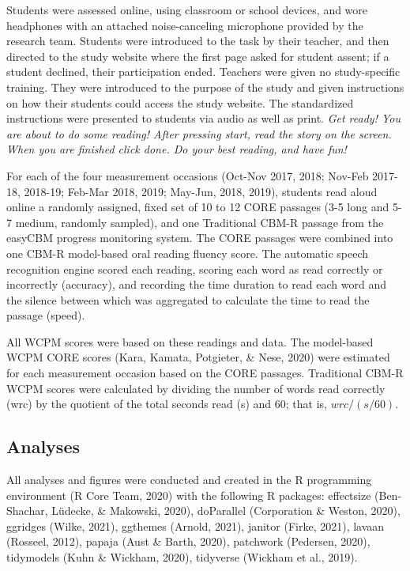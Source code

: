 \documentclass[
  english,
  man, fleqn, noextraspace]{apa6}
\begin{document}
Students were assessed online, using classroom or school devices, and wore headphones with an attached noise-canceling microphone provided by the research team. Students were introduced to the task by their teacher, and then directed to the study website where the first page asked for student assent; if a student declined, their participation ended. Teachers were given no study-specific training. They were introduced to the purpose of the study and given instructions on how their students could access the study website. The standardized instructions were presented to students via audio as well as print. \emph{Get ready! You are about to do some reading! After pressing start, read the story on the screen. When you are finished click done. Do your best reading, and have fun!}

For each of the four measurement occasions (Oct-Nov 2017, 2018; Nov-Feb 2017-18, 2018-19; Feb-Mar 2018, 2019; May-Jun, 2018, 2019), students read aloud online a randomly assigned, fixed set of 10 to 12 CORE passages (3-5 long and 5-7 medium, randomly sampled), and one Traditional CBM-R passage from the easyCBM progress monitoring system. The CORE passages were combined into one CBM-R model-based oral reading fluency score. The automatic speech recognition engine scored each reading, scoring each word as read correctly or incorrectly (accuracy), and recording the time duration to read each word and the silence between which was aggregated to calculate the time to read the passage (speed).

All WCPM scores were based on these readings and data. The model-based WCPM CORE scores (Kara, Kamata, Potgieter, \& Nese, 2020) were estimated for each measurement occasion based on the CORE passages. Traditional CBM-R WCPM scores were calculated by dividing the number of words read correctly (wrc) by the quotient of the total seconds read (s) and 60; that is, \(wrc/(s/60)\).

\hypertarget{analyses}{%
\subsection{Analyses}\label{analyses}}

All analyses and figures were conducted and created in the R programming environment (R Core Team, 2020) with the following R packages: effectsize (Ben-Shachar, Lüdecke, \& Makowski, 2020), doParallel (Corporation \& Weston, 2020), ggridges (Wilke, 2021), ggthemes (Arnold, 2021), janitor (Firke, 2021), lavaan (Rosseel, 2012), papaja (Aust \& Barth, 2020), patchwork (Pedersen, 2020), tidymodels (Kuhn \& Wickham, 2020), tidyverse (Wickham et al., 2019).
\end{document}

